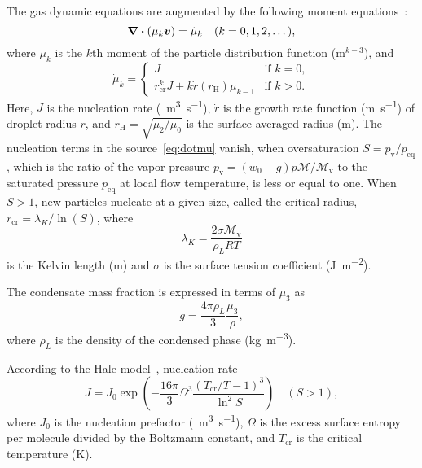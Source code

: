 \documentclass{article}
\newcommand{\vap}{\text{v}}
\newcommand{\eq}{\text{eq}}
\newcommand{\crit}[2][]{#2_\text{cr#1}}
\newcommand{\Hill}{\text{H}}
\newcommand{\bv}{\vb*{v}}
\begin{document}
The gas dynamic equations are augmented by the following moment equations~\cite{hill1966condensation}:
\begin{equation}\label{eq:mu_k}
    \div(\mu_k\bv) = \dot{\mu}_k \quad (k=0,1,2,\dots),
\end{equation}
where $\mu_k$ is the $k$th moment of the particle distribution function ($\si{\m}^{k-3}$), and
\begin{equation}\label{eq:dotmu}
    \dot\mu_k = \begin{cases}
        J &\text{if } k=0,\\
        \crit{r}^{k}J + k\dot{r}(r_\Hill)\mu_{k-1} &\text{if } k>0.
    \end{cases}
\end{equation}
Here, $J$ is the nucleation rate (\si{\per\cubic\m\per\s}),
$\dot{r}$ is the growth rate function (\si{\m\per\s}) of droplet radius $r$,
and $r_\Hill=\sqrt{\mu_2/\mu_0}$ is the surface-averaged radius (\si{\m}).
The nucleation terms in the source~\eqref{eq:dotmu} vanish, when oversaturation $S = p_\vap/p_\eq$,
which is the ratio of the vapor pressure $p_\vap = (w_0 - g)p\mathcal{M}/\mathcal{M}_\vap$
to the saturated pressure $p_\eq$ at local flow temperature, is less or equal to one.
When $S>1$, new particles nucleate at a given size,
called the critical radius, $\crit{r} = \lambda_K/\ln(S)$, where
\begin{equation}\label{eq:Kelvin}
    \lambda_K = \frac{2\sigma \mathcal{M}_\vap}{\rho_L R T}
\end{equation}
is the Kelvin length (\si{m}) and $\sigma$ is the surface tension coefficient (\si{\J\per\square\m}).

The condensate mass fraction is expressed in terms of $\mu_3$ as
\begin{equation}\label{eq:g}
     g = \frac{4\pi\rho_L}{3} \frac{\mu_3}{\rho},
\end{equation}
where $\rho_L$ is the density of the condensed phase (\si{\kg\per\cubic\m}).

According to the Hale model~\cite{hale2004scaling}, nucleation rate
\begin{equation}\label{eq:J}
    J = J_0\exp(-\frac{16\pi}{3}\Omega^3\frac{(\crit{T}/T-1)^3}{\ln^2{S}}) \quad (S > 1),
\end{equation}
where $J_0$ is the nucleation prefactor (\si{\per\cubic\m\per\s}),
$\Omega$ is the excess surface entropy per molecule divided by the Boltzmann constant,
and $\crit{T}$ is the critical temperature (\si{\K}).
\end{document}
